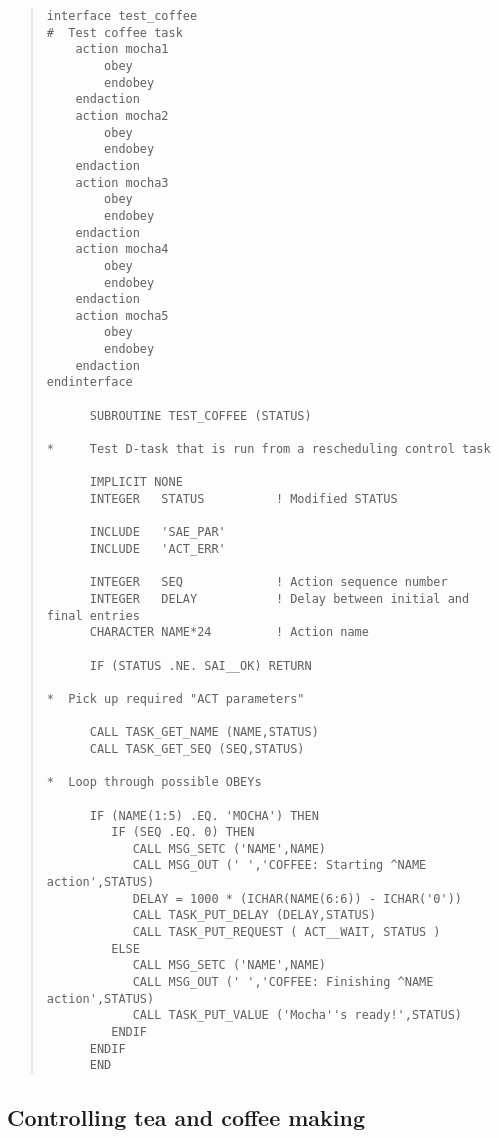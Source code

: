 \documentclass[twoside,11pt]{article}
\renewcommand{\_}{\texttt{\symbol{95}}}
\begin{document}
\small \begin{quote} \begin{verbatim}
interface test_coffee
#  Test coffee task
    action mocha1
        obey
        endobey
    endaction
    action mocha2
        obey
        endobey
    endaction
    action mocha3
        obey
        endobey
    endaction
    action mocha4
        obey
        endobey
    endaction
    action mocha5
        obey
        endobey
    endaction
endinterface

      SUBROUTINE TEST_COFFEE (STATUS)

*     Test D-task that is run from a rescheduling control task

      IMPLICIT NONE
      INTEGER   STATUS          ! Modified STATUS

      INCLUDE   'SAE_PAR'
      INCLUDE   'ACT_ERR'

      INTEGER   SEQ             ! Action sequence number
      INTEGER   DELAY           ! Delay between initial and final entries
      CHARACTER NAME*24         ! Action name

      IF (STATUS .NE. SAI__OK) RETURN

*  Pick up required "ACT parameters"

      CALL TASK_GET_NAME (NAME,STATUS)
      CALL TASK_GET_SEQ (SEQ,STATUS)

*  Loop through possible OBEYs

      IF (NAME(1:5) .EQ. 'MOCHA') THEN
         IF (SEQ .EQ. 0) THEN
            CALL MSG_SETC ('NAME',NAME)
            CALL MSG_OUT (' ','COFFEE: Starting ^NAME action',STATUS)
            DELAY = 1000 * (ICHAR(NAME(6:6)) - ICHAR('0'))
            CALL TASK_PUT_DELAY (DELAY,STATUS)
            CALL TASK_PUT_REQUEST ( ACT__WAIT, STATUS )
         ELSE
            CALL MSG_SETC ('NAME',NAME)
            CALL MSG_OUT (' ','COFFEE: Finishing ^NAME action',STATUS)
            CALL TASK_PUT_VALUE ('Mocha''s ready!',STATUS)
         ENDIF
      ENDIF
      END

\end{verbatim} \end{quote} \normalsize

\subsection{Controlling tea and coffee making}
\end{document}
